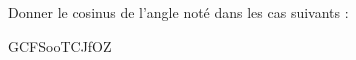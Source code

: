 
\begin{exercice}\label{exo2smath-0114}

Donner le cosinus de l'angle noté dans les cas suivants :

GCFSooTCJfOZ

\end{exercice}
